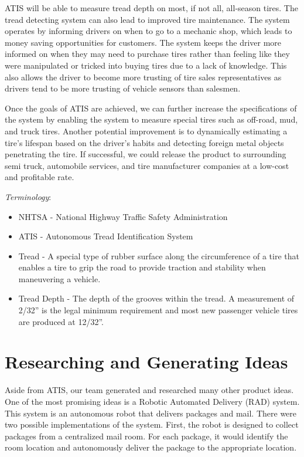 \documentclass[11pt]{IEEEtran}
\begin{document}
			ATIS will be able to measure tread depth on most, if not all, all-season tires. The tread detecting system can also lead to improved tire maintenance. The system operates by informing drivers on when to go to a mechanic shop, which leads to money saving opportunities for customers. The system keeps the driver more informed on when they may need to purchase tires rather than feeling like they were manipulated or tricked into buying tires due to a lack of knowledge. This also allows the driver to become more trusting of tire sales representatives as drivers tend to be more trusting of vehicle sensors than salesmen.

			Once the goals of ATIS are achieved, we can further increase the specifications of the system by enabling the system to measure special tires such as off-road, mud, and truck tires. Another potential improvement is to dynamically estimating a tire’s lifespan based on the driver’s habits and detecting foreign metal objects penetrating the tire. If successful, we could release the product to surrounding semi truck, automobile services, and tire manufacturer companies at a low-cost and profitable rate.

		\textit{Terminology}:
		\begin{itemize}
			\item NHTSA - National Highway Traffic Safety Administration
			\item ATIS - Autonomous Tread Identification System
			\item Tread - A special type of rubber surface along the circumference of a tire that enables a tire to grip the road to provide traction and stability when maneuvering a vehicle.
			\item Tread Depth - The depth of the grooves within the tread. A measurement of 2/32'' is the legal minimum requirement and most new passenger vehicle tires are produced at 12/32''.
		\end{itemize}


	\section{Researching and Generating Ideas}
		Aside from ATIS, our team generated and researched many other product ideas. One of the most promising ideas is a Robotic Automated Delivery (RAD) system. This system is an autonomous robot that delivers packages and mail. There were two possible implementations of the system. First, the robot is designed to collect packages from a centralized mail room. For each package, it would identify the room location and autonomously deliver the package to the appropriate location.
\end{document}

